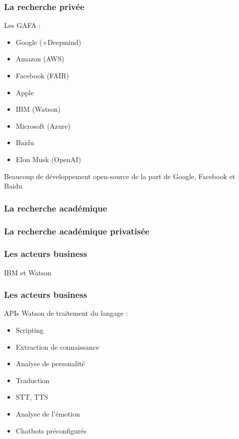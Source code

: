 \begin{frame}
  \frametitle{La recherche privée}
  Les GAFA :
  \begin{itemize}
  \item Google (+Deepmind)
  \item Amazon (AWS)
  \item Facebook (FAIR)
  \item Apple 
  \item IBM (Watson)
  \item Microsoft (Azure)
  \item Baidu
  \item Elon Musk (OpenAI)
  \end{itemize}
  Beaucoup de développement open-source de la part de Google, Facebook et Baidu
\end{frame}

\begin{frame}
  \frametitle{La recherche académique}
\end{frame}

\begin{frame}
  \frametitle{La recherche académique privatisée}
\end{frame}

\begin{frame}
  \frametitle{Les acteurs business}
  IBM et Watson
\end{frame}

\begin{frame}
  \frametitle{Les acteurs business}
  APIs Watson de traitement du langage : \\
  \begin{minipage}[c]{0.49\linewidth}
    \begin{itemize}
    \item Scripting
    \item Extraction de connaissance
    \item Analyse de personalité
    \item Traduction
    \end{itemize}
  \end{minipage}\hfill
  \begin{minipage}[c]{0.50\linewidth}
    \begin{itemize}
    \item STT, TTS
    \item Analyse de l'émotion
    \item Chatbots préconfigurés
    \end{itemize}
  \end{minipage}\hfill
\end{frame}

